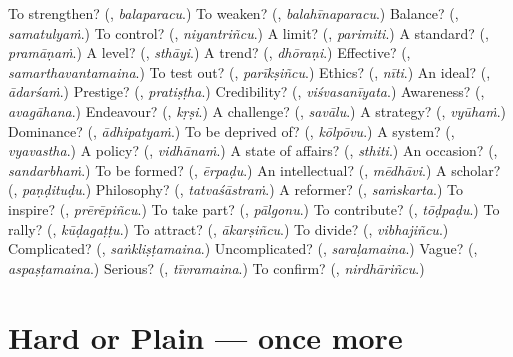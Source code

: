 \begin{tcolorbox}[breakable,colback=teal!4,colframe=teal!35!black,title={Before you move on}]
To strengthen? (\textbf{}, \emph{balaparacu}.) To weaken? (\textbf{}, \emph{balahīnaparacu}.) Balance? (\textbf{}, \emph{samatulyaṁ}.) To control? (\textbf{}, \emph{niyantriñcu}.) A limit? (\textbf{}, \emph{parimiti}.) A standard? (\textbf{}, \emph{pramāṇaṁ}.) A level? (\textbf{}, \emph{sthāyi}.) A trend? (\textbf{}, \emph{dhōraṇi}.) Effective? (\textbf{}, \emph{samarthavantamaina}.) To test out? (\textbf{}, \emph{parīkṣiñcu}.) Ethics? (\textbf{}, \emph{nīti}.) An ideal? (\textbf{}, \emph{ādarśaṁ}.) Prestige? (\textbf{}, \emph{pratiṣṭha}.) Credibility? (\textbf{}, \emph{viśvasanīyata}.) Awareness? (\textbf{}, \emph{avagāhana}.) Endeavour? (\textbf{}, \emph{kṛṣi}.) A challenge? (\textbf{}, \emph{savālu}.) A strategy? (\textbf{}, \emph{vyūhaṁ}.) Dominance? (\textbf{}, \emph{ādhipatyaṁ}.) To be deprived of? (\textbf{}, \emph{kōlpōvu}.) A system? (\textbf{}, \emph{vyavastha}.) A policy? (\textbf{}, \emph{vidhānaṁ}.) A state of affairs? (\textbf{}, \emph{sthiti}.) An occasion? (\textbf{}, \emph{sandarbhaṁ}.) To be formed? (\textbf{}, \emph{ērpaḍu}.) An intellectual? (\textbf{}, \emph{mēdhāvi}.) A scholar? (\textbf{}, \emph{paṇḍituḍu}.) Philosophy? (\textbf{}, \emph{tatvaśāstraṁ}.) A reformer? (\textbf{}, \emph{saṁskarta}.) To inspire? (\textbf{}, \emph{prērēpiñcu}.) To take part? (\textbf{}, \emph{pālgonu}.) To contribute? (\textbf{}, \emph{tōḍpaḍu}.) To rally? (\textbf{}, \emph{kūḍagaṭṭu}.) To attract? (\textbf{}, \emph{ākarṣiñcu}.) To divide? (\textbf{}, \emph{vibhajiñcu}.) Complicated? (\textbf{}, \emph{saṅkliṣṭamaina}.) Uncomplicated? (\textbf{}, \emph{saraḷamaina}.) Vague? (\textbf{}, \emph{aspaṣṭamaina}.) Serious? (\textbf{}, \emph{tīvramaina}.) To confirm? (\textbf{}, \emph{nirdhāriñcu}.)
\end{tcolorbox}
\section[(dialogue)]{Hard or Plain — once more}

